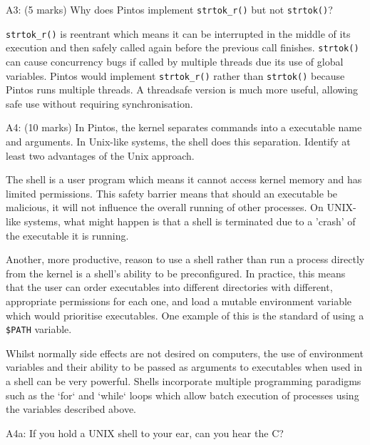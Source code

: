 \noindent A3: (5 marks)
Why does Pintos implement \texttt{strtok\_r()} but not \texttt{strtok()}?


\texttt{strtok\_r()} is reentrant which means it can be interrupted in the middle of its execution and then safely called again before the previous call finishes. \texttt{strtok()} can cause concurrency bugs if called by multiple threads due its use of global variables. Pintos would implement \texttt{strtok\_r()} rather than \texttt{strtok()} because Pintos runs multiple threads. A threadsafe version is much more useful, allowing safe use without requiring synchronisation.


\noindent A4: (10 marks)
In Pintos, the kernel separates commands into a executable name
and arguments.  In Unix-like systems, the shell does this
separation.  Identify at least two advantages of the Unix approach.


The shell is a user program which means it cannot access kernel memory and has limited permissions. This safety barrier means that should an executable be malicious, it will not influence the overall running of other processes. On UNIX-like systems, what might happen is that a shell is terminated due to a 'crash' of the executable it is running.

Another, more productive, reason to use a shell rather than run a process directly from the kernel is a shell's ability to be preconfigured. In practice, this means that the user can order executables into different directories with different, appropriate permissions for each one, and load a mutable environment variable which would prioritise executables. One example of this is the standard of using a \texttt{\$PATH} variable.

Whilst normally side effects are not desired on computers, the use of environment variables and their ability to be passed as arguments to executables when used in a shell can be very powerful. Shells incorporate multiple programming paradigms such as the `for` and `while` loops which allow batch execution of processes using the variables described above.


\noindent A4a: If you hold a UNIX shell to your ear, can you hear the C?




